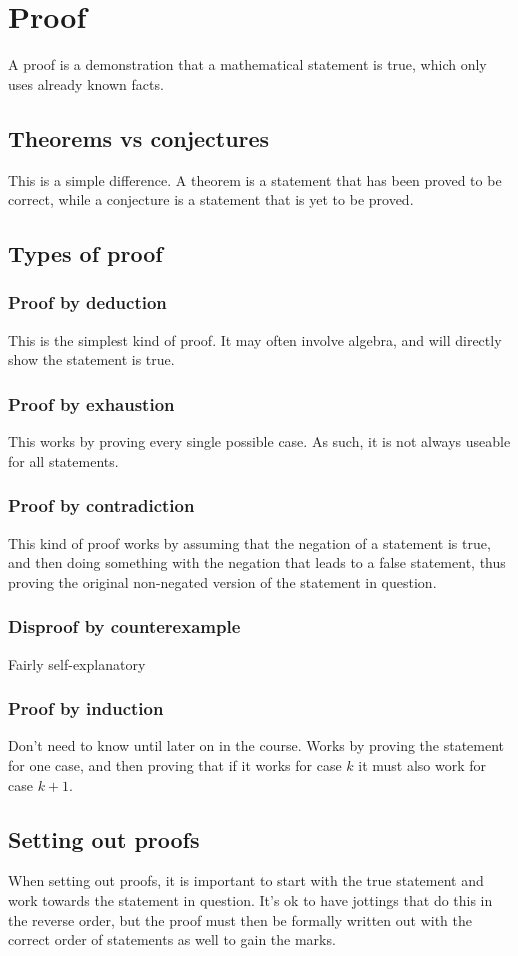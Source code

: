 \section{Proof}
A proof is a demonstration that a mathematical statement is true, which only uses already known facts.

\subsection{Theorems vs conjectures}
This is a simple difference. A theorem is a statement that has been proved to be correct, while a conjecture is a statement that is yet to be proved.

\subsection{Types of proof}
\subsubsection{Proof by deduction}
This is the simplest kind of proof. It may often involve algebra, and will directly show the statement is true.
\subsubsection{Proof by exhaustion}
This works by proving every single possible case. As such, it is not always useable for all statements.
\subsubsection{Proof by contradiction}
This kind of proof works by assuming that the negation of a statement is true, and then doing something with the negation that leads to a false statement, thus proving the original non-negated version of the statement in question.
\subsubsection{Disproof by counterexample}
Fairly self-explanatory
\subsubsection{Proof by induction}
Don't need to know until later on in the course. Works by proving the statement for one case, and then proving that if it works for case $k$ it must also work for case $k+1$.

\subsection{Setting out proofs}
When setting out proofs, it is important to start with the true statement and work towards the statement in question. It's ok to have jottings that do this in the reverse order, but the proof must then be formally written out with the correct order of statements as well to gain the marks.
